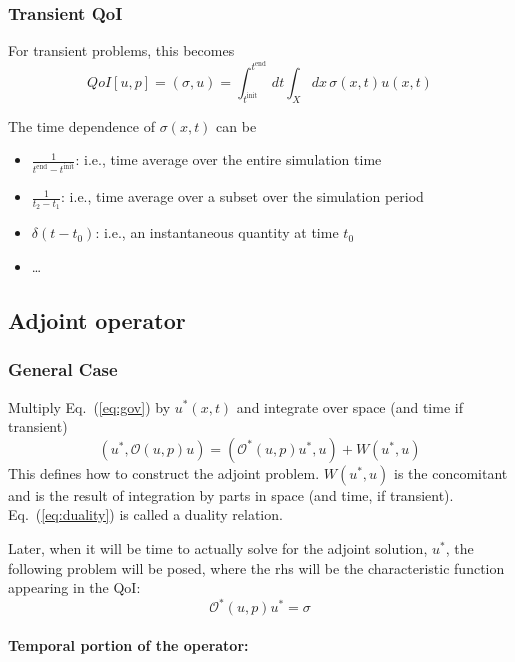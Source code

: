 \documentclass[11pt]{article}
\newcommand{\eqt}[1]{Eq.~(\ref{#1})}                     %
\newcommand{\be}{\begin{equation}}
\newcommand{\ee}{\end{equation}}
\renewcommand{\O}{\mathcal{O}}
\newcommand{\us}{{u^\ast}}
\newcommand{\ti}{ {t^{\text{init}}} }
\newcommand{\te}{ {t^{\text{end }}} }
\begin{document}
\subsubsection{Transient QoI}

For transient problems, this becomes
\be
QoI[u,p] = (\sigma, u) = \int_\ti ^\te dt \int_X  dx \, \sigma(x,t)u(x,t)
\ee

The time dependence of $\sigma(x,t)$ can be 
\begin{itemize}
\item $\frac{1}{t^{\text{end}}-t^{\text{init}}}$: i.e., time average over the entire simulation time 
\item $\frac{1}{t_2-t_1}$: i.e., time average over a subset over the simulation period
\item $\delta(t-t_0)$: i.e., an instantaneous quantity at time $t_0$
\item \ldots
\end{itemize}

\subsection{Adjoint operator}

\subsubsection{General Case}

Multiply \eqt{eq:gov} by $\us(x,t)$ and integrate over space (and time if transient)
\be
\label{eq:duality}
(\us,\O(u,p)u) = (\O^\ast(u,p)\us,u) + W(\us,u)
\ee
This defines how to construct the adjoint problem.
$W(\us,u)$ is the concomitant and is the result of integration by parts in space (and time, if transient). 
\eqt{eq:duality} is called a duality relation.


Later, when it will be time to actually solve for the adjoint solution, $\us$, the following problem will be
posed, where the rhs will be the characteristic function appearing in the QoI:
\be
\O^\ast(u,p)\us = \sigma
\ee
%

\paragraph{Temporal portion of the operator:}
\end{document}
